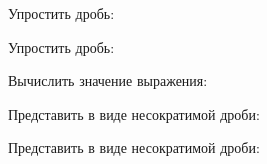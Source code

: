 \begin{listofex}
	\item Упростить дробь:
	\begin{enumcols}[itemcolumns=2]
		\item {}
		\item {}
		\item {}
		\item {}
		\item {}
		\item {}
	\end{enumcols}
	\item Упростить дробь:
	\begin{enumcols}[itemcolumns=2]
		\item {}
		\item {}
		\item {}
		\item {}
		\item {}
		\item {}
		\item {}
		\item {}
	\end{enumcols}
	\item Вычислить значение выражения:
	\item {}
	\item Представить в виде несократимой дроби:
	\begin{enumcols}[itemcolumns=3]
		\item {}
		\item {}
		\item {}
		\item {}
		\item {}
	\end{enumcols}
	\item Представить в виде несократимой дроби:
	\begin{enumcols}[itemcolumns=3]
		\item {}
		\item {}
		\item {}
	\end{enumcols}
	

\end{listofex}

